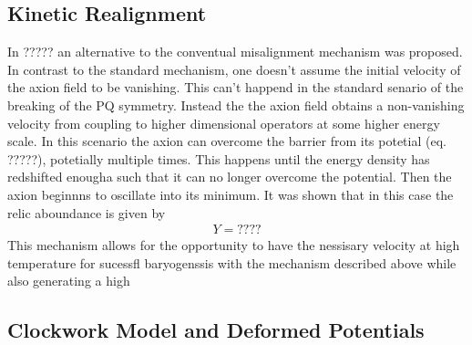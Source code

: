 \documentclass[13pt,a4paper,twoside,titlepage]{article}
\begin{document}


\subsection{Kinetic Realignment}
In ????? an alternative to the conventual misalignment mechanism was proposed.
In contrast to the standard mechanism, one doesn't assume the initial velocity of the axion field to be vanishing.
This can't happend in the standard senario of the breaking of the PQ symmetry.
Instead the the axion field obtains a non-vanishing velocity from coupling to higher
dimensional operators at some higher energy scale.
In this scenario the axion can overcome the barrier from its potetial (eq. ?????),
potetially multiple times.
This happens until the energy density has redshifted enougha such that it can no longer
overcome the potential. Then the axion beginnns to oscillate into its minimum.
It was shown that in this case the relic aboundance is given by
\begin{align}
    Y = ????
\end{align}
This mechanism allows for the opportunity to have the nessisary velocity at high temperature for sucessfl baryogenssis with the mechanism described above while also
generating a high

\subsection{Clockwork Model and Deformed Potentials}
\end{document}
